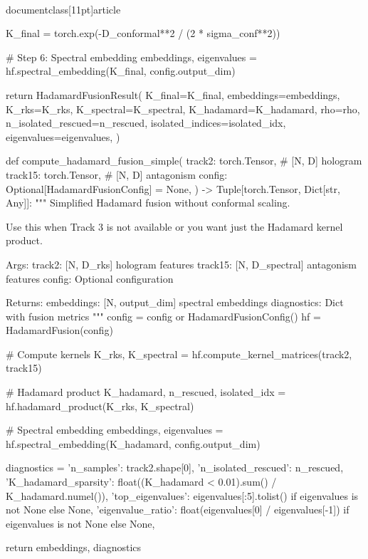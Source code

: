 \\documentclass[11pt]{article}
\begin{document}
\begin{CodeBlock}
    K_final = torch.exp(-D_conformal**2 / (2 * sigma_conf**2))

    # Step 6: Spectral embedding
    embeddings, eigenvalues = hf.spectral_embedding(K_final, config.output_dim)

    return HadamardFusionResult(
        K_final=K_final,
        embeddings=embeddings,
        K_rks=K_rks,
        K_spectral=K_spectral,
        K_hadamard=K_hadamard,
        rho=rho,
        n_isolated_rescued=n_rescued,
        isolated_indices=isolated_idx,
        eigenvalues=eigenvalues,
    )


def compute_hadamard_fusion_simple(
    track2: torch.Tensor,       # [N, D] hologram
    track15: torch.Tensor,      # [N, D] antagonism
    config: Optional[HadamardFusionConfig] = None,
) -> Tuple[torch.Tensor, Dict[str, Any]]:
    """
    Simplified Hadamard fusion without conformal scaling.

    Use this when Track 3 is not available or you want just the
    Hadamard kernel product.

    Args:
        track2: [N, D_rks] hologram features
        track15: [N, D_spectral] antagonism features
        config: Optional configuration

    Returns:
        embeddings: [N, output_dim] spectral embeddings
        diagnostics: Dict with fusion metrics
    """
    config = config or HadamardFusionConfig()
    hf = HadamardFusion(config)

    # Compute kernels
    K_rks, K_spectral = hf.compute_kernel_matrices(track2, track15)

    # Hadamard product
    K_hadamard, n_rescued, isolated_idx = hf.hadamard_product(K_rks, K_spectral)

    # Spectral embedding
    embeddings, eigenvalues = hf.spectral_embedding(K_hadamard, config.output_dim)

    diagnostics = {
        'n_samples': track2.shape[0],
        'n_isolated_rescued': n_rescued,
        'K_hadamard_sparsity': float((K_hadamard < 0.01).sum() / K_hadamard.numel()),
        'top_eigenvalues': eigenvalues[:5].tolist() if eigenvalues is not None else None,
        'eigenvalue_ratio': float(eigenvalues[0] / eigenvalues[-1]) if eigenvalues is not None else None,
    }

    return embeddings, diagnostics

\end{CodeBlock}
\end{document}
